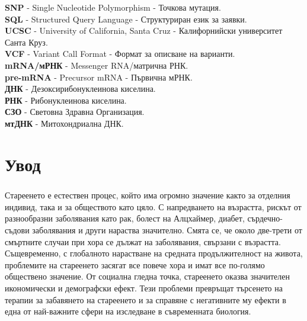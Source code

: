 \documentclass[pdftex,cyrillic,14pt,a4page,twoside,openright]{extreport}
\begin{document}
\textbf{SNP} - Single Nucleotide Polymorphism - Точкова мутация.\\
\textbf{SQL} - Structured Query Language - Структуриран език за заявки.\\
\textbf{UCSC} - University of California, Santa Cruz - Калифорнийски университет Санта Круз.\\
\textbf{VCF} - Variant Call Format - Формат за описване на варианти.\\
\textbf{mRNA/мРНК} - Messenger RNA/матрична РНК.\\
\textbf{pre-mRNA} - Precursor mRNA - Първична мРНК.\\
\textbf{ДНК} - Дезоксирибонуклеинова киселина.\\
\textbf{РНК} - Рибонуклеинова киселина.\\
\textbf{СЗО} - Световна Здравна Организация.\\
\textbf{мтДНК} - Митохондриална ДНК.\\


\chapter{Увод}
\paragraph{}

Стареенето е естествен процес, който има огромно значение както за отделния индивид, така и за обществото като цяло. С напредването на възрастта, рискът от разнообразни заболявания като рак, болест на Алцхаймер, диабет, сърдечно-съдови заболявания и други нараства значително. Смята се, че около две-трети от смъртните случаи при хора се дължат на заболявания, свързани с възрастта. Същевременно, с глобалното нарастване на средната продължителност на живота, проблемите на стареенето засягат все повече хора и имат все по-голямо обществено значение. От социална гледна точка, стареенето оказва значителен икономически и демографски ефект. Тези проблеми превръщат търсенето на терапии за забавянето на стареенето и за справяне с негативните му ефекти в една от най-важните сфери на изследване в съвременната биология.
\end{document}
